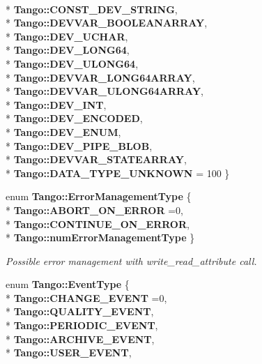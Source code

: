 \begin{DoxyCompactItemize}
\\*
{\bf Tango\-::\-C\-O\-N\-S\-T\-\_\-\-D\-E\-V\-\_\-\-S\-T\-R\-I\-N\-G}, 
\\*
{\bf Tango\-::\-D\-E\-V\-V\-A\-R\-\_\-\-B\-O\-O\-L\-E\-A\-N\-A\-R\-R\-A\-Y}, 
\\*
{\bf Tango\-::\-D\-E\-V\-\_\-\-U\-C\-H\-A\-R}, 
\\*
{\bf Tango\-::\-D\-E\-V\-\_\-\-L\-O\-N\-G64}, 
\\*
{\bf Tango\-::\-D\-E\-V\-\_\-\-U\-L\-O\-N\-G64}, 
\\*
{\bf Tango\-::\-D\-E\-V\-V\-A\-R\-\_\-\-L\-O\-N\-G64\-A\-R\-R\-A\-Y}, 
\\*
{\bf Tango\-::\-D\-E\-V\-V\-A\-R\-\_\-\-U\-L\-O\-N\-G64\-A\-R\-R\-A\-Y}, 
\\*
{\bf Tango\-::\-D\-E\-V\-\_\-\-I\-N\-T}, 
\\*
{\bf Tango\-::\-D\-E\-V\-\_\-\-E\-N\-C\-O\-D\-E\-D}, 
\\*
{\bf Tango\-::\-D\-E\-V\-\_\-\-E\-N\-U\-M}, 
\\*
{\bf Tango\-::\-D\-E\-V\-\_\-\-P\-I\-P\-E\-\_\-\-B\-L\-O\-B}, 
\\*
{\bf Tango\-::\-D\-E\-V\-V\-A\-R\-\_\-\-S\-T\-A\-T\-E\-A\-R\-R\-A\-Y}, 
\\*
{\bf Tango\-::\-D\-A\-T\-A\-\_\-\-T\-Y\-P\-E\-\_\-\-U\-N\-K\-N\-O\-W\-N} = 100
 \}
\item 
enum {\bf Tango\-::\-Error\-Management\-Type} \{ \\*
{\bf Tango\-::\-A\-B\-O\-R\-T\-\_\-\-O\-N\-\_\-\-E\-R\-R\-O\-R} =0, 
\\*
{\bf Tango\-::\-C\-O\-N\-T\-I\-N\-U\-E\-\_\-\-O\-N\-\_\-\-E\-R\-R\-O\-R}, 
\\*
{\bf Tango\-::num\-Error\-Management\-Type}
 \}
\begin{DoxyCompactList}\small\item\em Possible error management with write\-\_\-read\-\_\-attribute call. \end{DoxyCompactList}\item 
enum {\bf Tango\-::\-Event\-Type} \{ \\*
{\bf Tango\-::\-C\-H\-A\-N\-G\-E\-\_\-\-E\-V\-E\-N\-T} =0, 
\\*
{\bf Tango\-::\-Q\-U\-A\-L\-I\-T\-Y\-\_\-\-E\-V\-E\-N\-T}, 
\\*
{\bf Tango\-::\-P\-E\-R\-I\-O\-D\-I\-C\-\_\-\-E\-V\-E\-N\-T}, 
\\*
{\bf Tango\-::\-A\-R\-C\-H\-I\-V\-E\-\_\-\-E\-V\-E\-N\-T}, 
\\*
{\bf Tango\-::\-U\-S\-E\-R\-\_\-\-E\-V\-E\-N\-T}, 

\end{DoxyCompactItemize}
